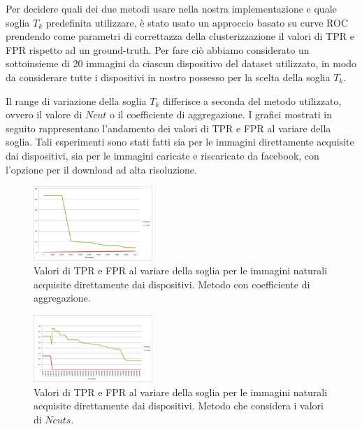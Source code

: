 Per decidere quali dei due metodi usare nella nostra implementazione e quale soglia $T_{k}$ predefinita utilizzare, è stato usato un approccio basato su curve ROC prendendo come parametri di correttazza della clusterizzazione il valori di TPR e FPR rispetto ad un ground-truth. Per fare ciò abbiamo considerato un sottoinsieme di 20 immagini da ciascun dispositivo del dataset utilizzato, in modo da considerare tutte i dispositivi in nostro possesso per la scelta della soglia $T_{k}$.

Il range di variazione della soglia $T_{k}$ differisce a seconda del metodo utilizzato, ovvero il valore di $Ncut$ o il coefficiente di aggregazione. I grafici mostrati in seguito rappresentano l'andamento dei valori di TPR e FPR al variare della soglia. Tali esperimenti sono stati fatti sia per le immagini direttamente acquisite dai dispositivi, sia per le immagini caricate e riscaricate da facebook, con l'opzione per il download ad alta risoluzione.

\begin{figure}[h]
\begin{center}
\includegraphics[width=0.4\textwidth]{images/soglia_imgnat_AC.png}
\end{center}
  \caption{Valori di TPR e FPR al variare della soglia per le immagini naturali acquisite direttamente dai dispositivi. Metodo con coefficiente di aggregazione.}
\label{fig:soglia AC}
\end{figure}

\begin{figure}[h]
\begin{center}
\includegraphics[width=0.4\textwidth]{images/soglia_imgnat_NC.png}
\end{center}
  \caption{Valori di TPR e FPR al variare della soglia per le immagini naturali acquisite direttamente dai dispositivi. Metodo che considera i valori di $Ncuts$.}
\label{fig:soglia AC}
\end{figure}

